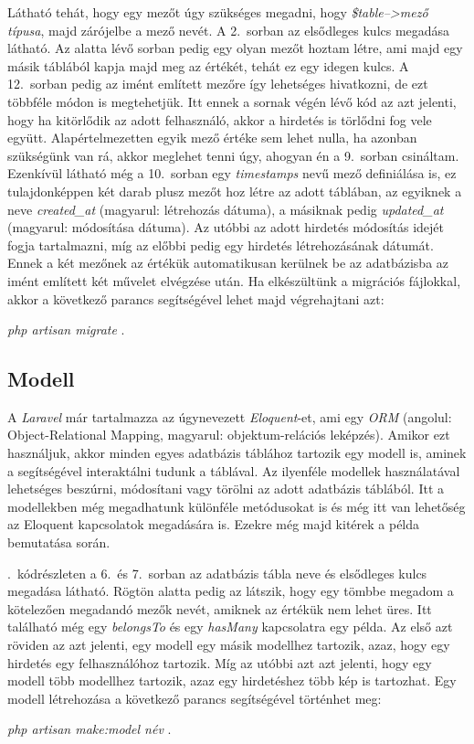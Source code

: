 \documentclass[]{thesis-ekf}
\theoremstyle{definition}
\theoremstyle{remark}
\begin{document}
		Látható tehát, hogy egy mezőt úgy szükséges megadni, hogy \emph{\$table-->mező típusa}, majd zárójelbe a mező nevét. A 2.~sorban az elsődleges kulcs megadása látható. Az alatta lévő sorban pedig egy olyan mezőt hoztam létre, ami majd egy másik táblából kapja majd meg az értékét, tehát ez egy idegen kulcs. A 12.~sorban pedig az imént említett mezőre így lehetséges hivatkozni, de ezt többféle módon is megtehetjük. Itt ennek a sornak végén lévő kód az azt jelenti, hogy ha kitörlődik az adott felhasználó, akkor a hirdetés is törlődni fog vele együtt. Alapértelmezetten egyik mező értéke sem lehet nulla, ha azonban szükségünk van rá, akkor meglehet tenni úgy, ahogyan én a 9.~sorban csináltam. Ezenkívül látható még a 10.~sorban egy \emph{timestamps} nevű mező definiálása is, ez tulajdonképpen két darab plusz mezőt hoz létre az adott táblában, az egyiknek a neve \emph{created\_at} (magyarul: létrehozás dátuma), a másiknak pedig \emph{updated\_at} (magyarul: módosítása dátuma). Az utóbbi az adott hirdetés módosítás idejét fogja tartalmazni, míg az előbbi pedig egy hirdetés létrehozásának dátumát. Ennek a két mezőnek az értékük automatikusan kerülnek be az adatbázisba az imént említett két művelet elvégzése után. Ha elkészültünk a migrációs fájlokkal, akkor a következő parancs segítségével lehet majd végrehajtani azt:
		\begin{center}
			\emph{php artisan migrate} .
		\end{center}
	\subsection{Modell}
		A \emph{Laravel} már tartalmazza az úgynevezett \emph{Eloquent}-et, ami egy \emph{ORM} (angolul: Object-Relational Mapping, magyarul: objektum-relációs leképzés). Amikor ezt használjuk, akkor minden egyes adatbázis táblához tartozik egy modell is, aminek a segítségével interaktálni tudunk a táblával. Az ilyenféle modellek használatával lehetséges beszúrni, módosítani vagy törölni az adott adatbázis táblából. Itt a modellekben még megadhatunk különféle metódusokat is és még itt van lehetőség az Eloquent kapcsolatok megadására is. Ezekre még majd kitérek a példa bemutatása során.\cite{Laravel}
		
		
		
		.~kódrészleten a 6.~és 7.~sorban az adatbázis tábla neve és elsődleges kulcs megadása látható. Rögtön alatta pedig az látszik, hogy egy tömbbe megadom a kötelezően megadandó mezők nevét, amiknek az értékük nem lehet üres. Itt található még egy \emph{belongsTo} és egy \emph{hasMany} kapcsolatra egy példa. Az első azt röviden az azt jelenti, egy modell egy másik modellhez tartozik, azaz, hogy egy hirdetés egy felhasználóhoz tartozik. Míg az utóbbi azt azt jelenti, hogy egy modell több modellhez tartozik, azaz egy hirdetéshez több kép is tartozhat. Egy modell létrehozása a következő parancs segítségével történhet meg:
		\begin{center} 
			\emph{php artisan make:model név} .
		\end{center}
	
\end{document}
